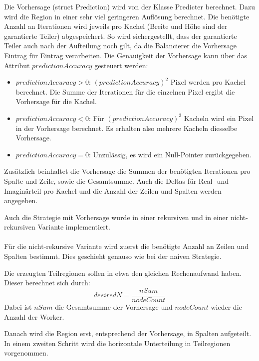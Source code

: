 Die Vorhersage (struct Prediction) wird von der Klasse Predicter berechnet.
Dazu wird die Region in einer sehr viel geringeren Auflösung berechnet.
Die benötigte Anzahl an Iterationen wird jeweils pro Kachel (Breite und Höhe sind der garantierte Teiler) abgespeichert.
So wird sichergestellt, dass der garantierte Teiler auch nach der Aufteilung noch gilt, da die Balancierer die Vorhersage Eintrag für Eintrag verarbeiten.
Die Genauigkeit der Vorhersage kann über das Attribut $predictionAccuracy$ gesteuert werden:
\begin{itemize}
	\item $predictionAccuracy > 0$: $(predictionAccuracy)^2$ Pixel werden pro Kachel berechnet. Die Summe der Iterationen für die einzelnen Pixel ergibt die Vorhersage für die Kachel.
	\item $predictionAccuracy < 0$: Für $(predictionAccuracy)^2$ Kacheln wird ein Pixel in der Vorhersage berechnet. Es erhalten also mehrere Kacheln diesselbe Vorhersage.
	\item $predictionAccuracy = 0$: Unzulässig, es wird ein Null-Pointer zurückgegeben.
\end{itemize}
Zusätzlich beinhaltet die Vorhersage die Summen der benötigten Iterationen pro Spalte und Zeile, sowie die Gesamtsumme.
Auch die Deltas für Real- und Imaginärteil pro Kachel und die Anzahl der Zeilen und Spalten werden angegeben.

Auch die Strategie mit Vorhersage wurde in einer rekursiven und in einer nicht-rekursiven Variante implementiert.

\paragraph*{} \label{lastbalancierung_vorhersage}
Für die nicht-rekursive Variante wird zuerst die benötigte Anzahl an Zeilen und Spalten bestimmt.
Dies geschieht genauso wie bei der naiven Strategie.

Die erzeugten Teilregionen sollen in etwa den gleichen Rechenaufwand haben. Dieser berechnet sich durch:
\begin{equation} \label{lastbalancierung_vorhersage_formel}
	desiredN = \frac{nSum}{nodeCount}
\end{equation}
Dabei ist $nSum$ die Gesamtsumme der Vorhersage und $nodeCount$ wieder die Anzahl der Worker.

Danach wird die Region erst, entsprechend der Vorhersage, in Spalten aufgeteilt. In einem zweiten Schritt wird die horizontale Unterteilung in Teilregionen vorgenommen. 

